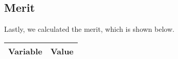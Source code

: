\vspace{0.4cm}



\subsection{Merit}

Lastly, we calculated the merit, which is shown below.

\vspace{0.4cm}

\begin{center}
\begin{tabular}{|l|r|}
  \hline    
  {\bf Variable} & {\bf Value} \\ \hline
  
\end{tabular}
\end{center}
